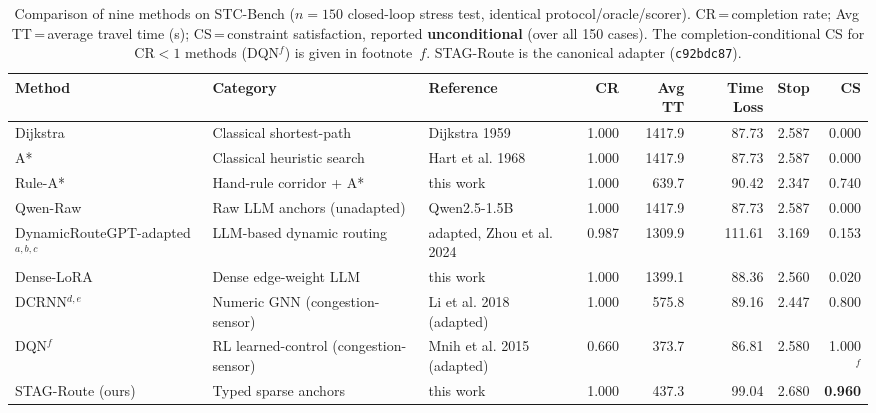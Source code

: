 \begin{table}[t]
\centering
\footnotesize
\caption{Comparison of nine methods on STC-Bench ($n{=}150$ closed-loop stress test, identical
  protocol/oracle/scorer). CR\,=\,completion rate; Avg\,TT\,=\,average travel time (s);
  CS\,=\,constraint satisfaction, reported \textbf{unconditional} (over all 150 cases). The
  completion-conditional CS for CR${<}1$ methods (DQN$^{f}$) is given in footnote~$f$. STAG-Route is
  the canonical adapter (\texttt{c92bdc87}).}
\label{tab:main}
\setlength{\tabcolsep}{4pt}
\begin{tabular}{@{}p{2.6cm}p{2.3cm}p{2.1cm}rrrrr@{}}
\toprule
Method & Category & Reference & CR & Avg TT & Time Loss & Stop & CS \\
\midrule
Dijkstra & Classical shortest-path & Dijkstra 1959 & 1.000 & 1417.9 & 87.73 & 2.587 & 0.000 \\
A* & Classical heuristic search & Hart et al. 1968 & 1.000 & 1417.9 & 87.73 & 2.587 & 0.000 \\
Rule-A* & Hand-rule corridor + A* & this work & 1.000 & 639.7 & 90.42 & 2.347 & 0.740 \\
Qwen-Raw & Raw LLM anchors (unadapted) & Qwen2.5-1.5B & 1.000 & 1417.9 & 87.73 & 2.587 & 0.000 \\
DynamicRouteGPT-adapted$^{a,b,c}$ & LLM-based dynamic routing & adapted, Zhou et al. 2024 & 0.987 & 1309.9 & 111.61 & 3.169 & 0.153 \\
Dense-LoRA & Dense edge-weight LLM & this work & 1.000 & 1399.1 & 88.36 & 2.560 & 0.020 \\
DCRNN$^{d,e}$ & Numeric GNN (congestion-sensor) & Li et al. 2018 (adapted) & 1.000 & 575.8 & 89.16 & 2.447 & 0.800 \\
DQN$^{f}$ & RL learned-control (congestion-sensor) & Mnih et al. 2015 (adapted) & 0.660 & 373.7 & 86.81 & 2.580 & 1.000$^{f}$ \\
STAG-Route (ours) & Typed sparse anchors & this work & 1.000 & 437.3 & 99.04 & 2.680 & \textbf{0.960} \\
\bottomrule
\end{tabular}


\end{table}
